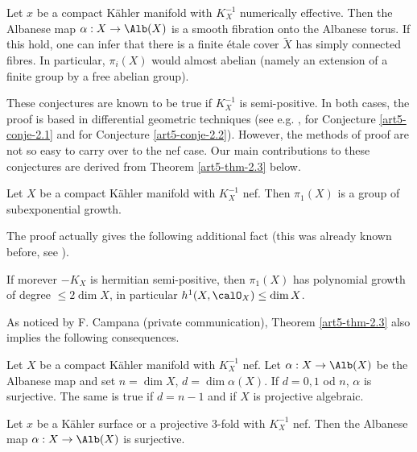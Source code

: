 \begin{conjecture}\label{art5-conje-2.2}
Let $x$ be a compact K\"ahler manifold with $K_{X}^{-1}$ numerically effective. Then the Albanese map $\alpha : X\rightarrow \Alb(X)$ is a smooth fibration onto the Albanese torus. If this hold, one can infer that there is a finite
\'etale cover $\widetilde{X}$ has simply connected fibres. In particular, $\pi_{i}(X)$ would almost abelian (namely an extension of a finite group by a free abelian group).

These conjectures are known to be true if $K_{X}^{-1}$ is semi-positive. In both cases, the proof is based in differential geometric techniques (see e.g. \cite{art5-keyBi63}, \cite{art5-keyHK78} for Conjecture \ref{art5-conje-2.1} and \cite{art5-keyLi71} for Conjecture \ref{art5-conje-2.2}). However, the methods of proof are not so easy to carry over to the nef case. Our main contributions to these conjectures are derived from Theorem \ref{art5-thm-2.3} below.
\end{conjecture}

\begin{theorem}\label{art5-thm-2.3}
Let $X$ be a compact K\"ahler manifold with $K_{X}^{-1}$ nef. Then $\pi_{1}(X)$ is a group of subexponential growth.
\end{theorem}

The proof actually gives the following additional fact (this was already known before, see \cite{art5-keyBi63}).

\begin{coro}\label{art5-coro-2.4}
If morever $-K_{X}$ is hermitian semi-positive, then $\pi_{1}(X)$ has polynomial growth of degree $\leq 2 \dim X$, in particular $h^{1}(X, \calO_{X}) \leq \dim X$.
\end{coro}

As noticed by F. Campana (private communication), Theorem \ref{art5-thm-2.3} also implies the following consequences. 

\begin{coro}\label{art5-coro-2.5}
Let $X$ be a compact K\"ahler manifold with $K_{X}^{-1}$ nef. Let $\alpha : X\rightarrow \Alb(X)$ be the Albanese map and set $n=\dim X$, $d=\dim \alpha(X)$. If $d=0, 1$ od $n$, $\alpha$ is surjective. The same is true if $d = n-1$ and if $X$ is projective algebraic. 
\end{coro}

\begin{coro}\label{art5-coro-2.6}
Let $x$ be a K\"ahler surface or a projective 3-fold with $K_{X}^{-1}$ nef. Then the Albanese map $\alpha : X\rightarrow \Alb(X)$ is surjective.
\end{coro}

